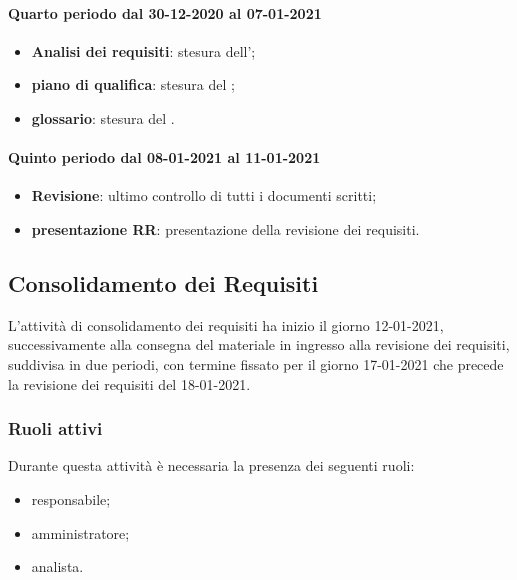 \paragraph{Quarto periodo dal 30-12-2020 al 07-01-2021} 
\begin{itemize} 
	\item \textbf{Analisi dei requisiti}: stesura dell’; 
	\item \textbf{piano di qualifica}: stesura del ; 
	\item \textbf{glossario}: stesura del . 
\end{itemize} 

\paragraph{Quinto periodo dal 08-01-2021 al 11-01-2021} 
\begin{itemize} 
	\item \textbf{Revisione}: ultimo controllo di tutti i documenti scritti; 
	\item \textbf{presentazione RR}: presentazione della revisione dei requisiti. 
\end{itemize} 


\newpage 


\newpage 

\subsection{Consolidamento dei Requisiti} 
L'attività di consolidamento dei requisiti ha inizio il giorno 12-01-2021, successivamente alla consegna del materiale in ingresso alla revisione dei requisiti, suddivisa in due periodi, con termine fissato 
per il giorno 17-01-2021 che precede la revisione dei requisiti del 18-01-2021. 

\subsubsection{Ruoli attivi} 
Durante questa attività è necessaria la presenza dei seguenti ruoli: 
\begin{itemize} 
	\item responsabile; 
	\item amministratore; 
	\item analista. 
\end{itemize} 

